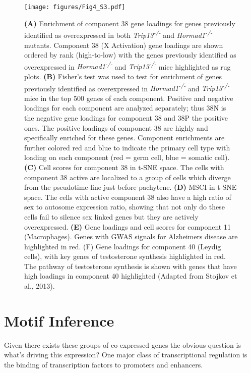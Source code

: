 \begin{figure}[H]
	\centering
	\texttt{[image: figures/Fig4\_S3.pdf]}
	\caption{
		\textbf{(A)} Enrichment of component 38 gene loadings for genes previously identified as overexpressed in both \textit{Trip13\textsuperscript{-/-}} and \textit{Hormad1\textsuperscript{-/-}} mutants. Component 38 (X Activation) gene loadings are shown ordered by rank (high-to-low) with the genes previously identified as overexpressed in \textit{Hormad1\textsuperscript{-/-}} and \textit{Trip13\textsuperscript{-/-}} mice highlighted as rug plots.
		\textbf{(B)} Fisher’s test was used to test for enrichment of genes previously identified as overexpressed in \textit{Hormad1\textsuperscript{-/-}} and \textit{Trip13\textsuperscript{-/-}} mice in the top 500 genes of each component. Positive and negative loadings for each component are analyzed separately; thus 38N is the negative gene loadings for component 38 and 38P the positive ones. The positive loadings of component 38 are highly and specifically enriched for these genes. Component enrichments are further colored red and blue to indicate the primary cell type with loading on each component (red = germ cell, blue = somatic cell). 
		\textbf{(C)} Cell scores for component 38 in t-SNE space. The cells with component 38 active are localized to a group of cells which diverge from the pseudotime-line just before pachytene.
		\textbf{(D)} MSCI in t-SNE space. The cells with active component 38 also have a high ratio of sex to autosome expression ratio, showing that not only do these cells fail to silence sex linked genes but they are actively overexpressed.
		\textbf{(E)} Gene loadings and cell scores for component 11 (Macrophages). Genes with GWAS signals for Alzheimers disease are highlighted in red. (F) Gene loadings for component 40 (Leydig cells), with key genes of testosterone synthesis highlighted in red. The pathway of testosterone synthesis is shown with genes that have high loadings in component 40 highlighted (Adapted from Stojkov et al., 2013).
	}
	\label{fig:MiscComponents}
\end{figure}


\section{Motif Inference}
Given there exists these groups of co-expressed genes the obvious question is what's driving this expression? One major class of transcriptional regulation is the binding of transcription factors to promoters and enhancers.

